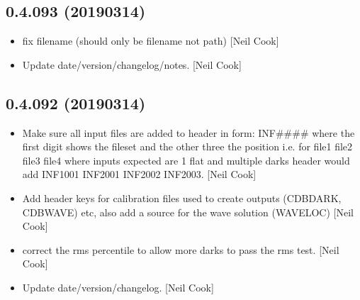 \documentclass[a4paper,10pt,english]{report}
\begin{document}
\subsection{0.4.093 (2019\sphinxhyphen{}03\sphinxhyphen{}14)}
\label{\detokenize{misc/changelog:id185}}\begin{itemize}
\item {} 
 \sphinxhyphen{} fix filename (should only be filename not
path) {[}Neil Cook{]}

\item {} 
Update date/version/changelog/notes. {[}Neil Cook{]}

\end{itemize}


\subsection{0.4.092 (2019\sphinxhyphen{}03\sphinxhyphen{}14)}
\label{\detokenize{misc/changelog:id186}}\begin{itemize}
\item {} 
Make sure all input files are added to header in form: INF\#\#\#\# where
the first digit shows the file\sphinxhyphen{}set and the other three the position
i.e. for   file1 file2 file3 file4   where inputs
expected are 1 flat and multiple darks header would add INF1001
INF2001 INF2002 INF2003. {[}Neil Cook{]}

\item {} 
Add header keys for calibration files used to create outputs (CDBDARK,
CDBWAVE) etc, also add a source for the wave solution (WAVELOC) {[}Neil
Cook{]}

\item {} 
 \sphinxhyphen{} correct the rms percentile to allow more darks to
pass the rms test. {[}Neil Cook{]}

\item {} 
Update date/version/changelog. {[}Neil Cook{]}

\end{itemize}
\end{document}
